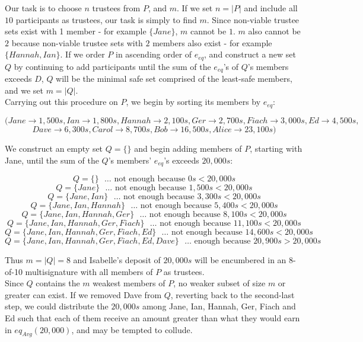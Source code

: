 \documentclass{report}
\begin{document}
			Our task is to choose $n$ trustees from $P$, and $m$. If we set $n = |P|$ and include all $10$ participants as trustees,  our task is simply to find $m$. Since non-viable trustee sets exist with 1 member - for example $\{Jane\}$, $m$ cannot be $1$. $m$ also cannot be $2$ because non-viable trustee sets with $2$ members also exist - for example $\{ Hannah, Ian\}$. If we order $P$ in ascending order of $e_{eq}$, and construct a new set $Q$ by continuing to add participants until the sum of the $e_{eq}$'s of $Q$'s members exceeds $D$, $Q$ will be the minimal safe set comprised of the least-safe members, and we set $m = |Q|$. \\
			
			Carrying out this procedure on $P$, we begin by sorting its members by $e_{eq}$:
			
			\[(Jane \rightarrow 1,500s, Ian \rightarrow 1,800s, Hannah \rightarrow 2,100s, Ger \rightarrow 2,700s, Fiach \rightarrow 3,000s, Ed \rightarrow 4,500s,\]
			\[Dave \rightarrow 6,300s, Carol \rightarrow 8,700s, Bob \rightarrow 16,500s, Alice \rightarrow 23,100s)\]
			
			We construct an empty set $Q = \{\}$ and begin adding members of $P$, starting with Jane, until the sum of the $Q$'s members' $e_{eq}$'s exceeds $20,000s$:
			
			\[ Q = \{  \} \mbox{  } \dots \mbox{ not enough because } 0s < 20,000s \]
			\[ Q = \{ Jane \} \mbox{  } \dots \mbox{ not enough because } 1,500s < 20,000s \]
			\[ Q = \{ Jane, Ian \} \mbox{  } \dots \mbox{ not enough because } 3,300s < 20,000s \]
			\[ Q = \{ Jane, Ian, Hannah \} \mbox{  } \dots \mbox{ not enough because } 5,400s < 20,000s \]
			\[ Q = \{ Jane, Ian, Hannah, Ger \} \mbox{  } \dots \mbox{ not enough because } 8,100s < 20,000s \]
			\[ Q = \{ Jane, Ian, Hannah, Ger, Fiach \} \mbox{  } \dots \mbox{ not enough because } 11,100s < 20,000s \]
			\[ Q = \{ Jane, Ian, Hannah, Ger, Fiach, Ed \} \mbox{  } \dots \mbox{ not enough because } 14,600s < 20,000s \]
			\[ Q = \{ Jane, Ian, Hannah, Ger, Fiach, Ed, Dave \} \mbox{  } \dots \mbox{ enough because } 20,900s > 20,000s \]
			
			Thus $m = |Q| = 8$ and Isabelle's deposit of $20,000s$ will be encumbered in an 8-of-10 multisignature with all members of $P$ as trustees. \\
			
			Since $Q$ contains the $m$ weakest members of $P$, no weaker subset of size $m$ or greater can exist. If we removed Dave from $Q$, reverting back to the second-last step, we could distribute the $20,000s$ among Jane, Ian, Hannah, Ger, Fiach and Ed such that each of them receive an amount greater than what they would earn in $eq_{Avg}(20,000)$, and may be tempted to collude. \\
			
\end{document}
